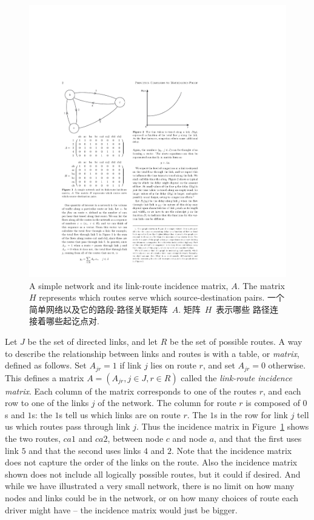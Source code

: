 \documentclass[a4paper,12pt, twocolumn]{article}
\begin{document}
\begin{figure}[ht]
\centering
\includegraphics{p1}
\caption{A simple network and its link-route incidence matrix, $A$.
The matrix $H$ represents which routes serve which source-destination pairs.
一个简单网络以及它的路段-路径关联矩阵~$A$. 矩阵~$H$~表示哪些
路径连接着哪些起讫点对.
\label{Fig-pcm0052.1}}
\end{figure}

Let $J$ be the set of directed links, and let $R$ be
the set of possible routes. A way to 
describe the relationship between links and routes is 
with a table, or {\it matrix}, defined as follows.
Set $A_{jr}=1$ if link $j$
lies on route $r$, and set $A_{jr}=0$ otherwise. 
This defines a  matrix $A=(A_{jr}, j\in J, r\in R)$
called the {\it link-route incidence matrix}. Each column
of the matrix corresponds to one of the routes $r$, and each row
to one of the links $j$ of the network. The
column for route $r$ is composed of $0$s and $1$s: the
$1$s tell us which links are on route $r$. 
The $1$s in the row for link $j$ tell us which routes
pass through link $j$. Thus the incidence matrix in
Figure~\ref{Fig-pcm0052.1} shows the two routes, $ca1$ and
$ca2$, between node $c$ and node $a$, and that the first uses 
link $5$ and that the second uses links $4$ and $2$. 
Note that the incidence matrix  does not capture 
the order of the links on the route. 
Also the incidence matrix 
shown does not include all logically possible routes, 
but it could if desired.  And while we have illustrated a
very small network, there is no limit on how many 
nodes and links  could be in the network, or on how
many choices of route each driver might have -- the
incidence matrix would just be bigger. 
\end{document}
